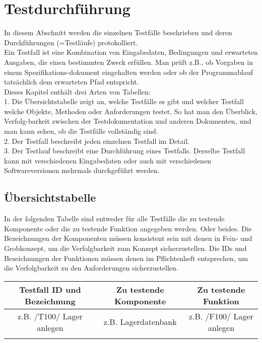 
\chapter{Testdurchführung}

In diesem Abschnitt werden die einzelnen Testfälle beschrieben und deren
Durchführungen (=Testläufe) protokolliert.\\
Ein Testfall ist eine Kombination von Eingabedaten, Bedingungen und erwarteten
Ausgaben, die einen bestimmten Zweck erfüllen. Man prüft z.B., ob Vorgaben in
einem Spezifikations-dokument eingehalten werden oder ob der Programmablauf
tatsächlich dem erwarteten Pfad entspricht.\\
Dieses Kapitel enthält drei Arten von Tabellen:\\
1.  Die Übersichtstabelle zeigt an, welche Testfälle es gibt und welcher
Testfall welche Objekte, Methoden oder Anforderungen testet. So hat man den
Überblick, Verfolg-barkeit zwischen der Testdokumentation und anderen
Dokumenten, und man kann sehen, ob die Testfälle vollständig sind.\\
2.  Der Testfall beschreibt jeden einzelnen Testfall im Detail.\\
3.  Der Testlauf beschreibt eine Durchführung eines Testfalls. Derselbe
Testfall kann mit verschiedenen Eingabedaten oder auch mit verschiedenen
Softwareversionen mehrmals durchgeführt werden.\\

\section{Übersichtstabelle}
  In der folgenden Tabelle sind entweder für alle Testfälle die zu testende
  Komponente oder die zu testende Funktion angegeben werden. Oder beides. Die
  Bezeichnungen der Komponenten müssen konsistent sein mit denen in Fein- und
  Grobkonzept, um die Verfolgbarkeit zum Konzept sicherzustellen. Die IDs und
  Bezeichnungen der Funktionen müssen denen im Pflichtenheft entsprechen, um
  die Verfolgbarkeit zu den Anforderungen sicherzustellen. \\
\begin{tabular}{|c|c|c|}
\hline
\textbf{Testfall ID und Bezeichnung} &  \textbf {Zu testende Komponente} &
\textbf {Zu testende Funktion}\\
\hline
z.B. /T100/ Lager anlegen &  z.B. Lagerdatenbank  & z.B. /F100/ Lager anlegen \\
\hline
&&
\end{tabular}

